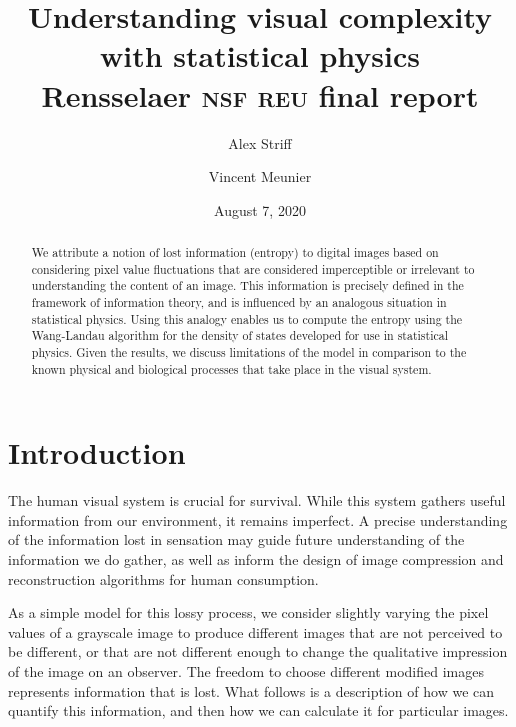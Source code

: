 \documentclass[aps,reprint,floatfix]{revtex4-2}
\theoremstyle{plain}
\theoremstyle{definition}
\begin{document}
\title{Understanding visual complexity with statistical physics\\
Rensselaer \textsc{nsf} \textsc{reu} final report}
\author{Alex Striff}
\author{Vincent Meunier}
\date{August 7, 2020}
\begin{abstract}
  We attribute a notion of lost information (entropy) to digital images based on
  considering pixel value fluctuations that are considered imperceptible or
  irrelevant to understanding the content of an image. This information is
  precisely defined in the framework of information theory, and is influenced by
  an analogous situation in statistical physics. Using this analogy enables us
  to compute the entropy using the Wang-Landau algorithm for the density of
  states developed for use in statistical physics. Given the results, we discuss
  limitations of the model in comparison to the known physical and biological
  processes that take place in the visual system.
\end{abstract}
\maketitle

\tableofcontents
\newpage

\section{Introduction}

The human visual system is crucial for survival. While this system gathers
useful information from our environment, it remains imperfect. A precise
understanding of the information lost in sensation may guide future
understanding of the information we do gather, as well as inform the design of
image compression and reconstruction algorithms for human consumption.

As a simple model for this lossy process, we consider slightly varying the pixel
values of a grayscale image to produce different images that are not perceived
to be different, or that are not different enough to change the qualitative
impression of the image on an observer. The freedom to choose different modified
images represents information that is lost. What follows is a description of how
we can quantify this information, and then how we can calculate it for
particular images.
\end{document}

